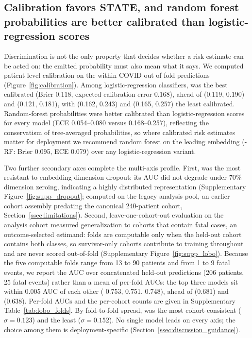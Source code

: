 \subsection{Calibration favors STATE, and random forest probabilities are better calibrated than logistic-regression scores}
\label{ssec:r5_calibration}

Discrimination is not the only property that decides whether a risk estimate
can be acted on: the emitted probability must also mean what it says. We
computed patient-level calibration on the within-COVID out-of-fold predictions
(Figure~\ref{fig:calibration}). Among logistic-regression classifiers,
 was the best calibrated (Brier 0.118, expected calibration error
0.168), ahead of  (0.119, 0.190) and 
(0.121, 0.181), with  (0.162, 0.243) and  (0.165,
0.257) the least calibrated. Random-forest probabilities were better
calibrated than logistic-regression scores for every model (ECE 0.054--0.080
versus 0.168--0.257), reflecting the conservatism of tree-averaged
probabilities, so where calibrated risk estimates matter for deployment we
recommend random forest on the leading embedding (-RF: Brier
0.095, ECE 0.079) over any logistic-regression variant.

Two further secondary axes complete the multi-axis profile. First,
 was the most resistant to embedding-dimension dropout: its AUC did
not degrade under 70\% dimension zeroing, indicating a highly distributed
representation (Supplementary Figure~\ref{fig:supp_dropout}; computed on the
legacy analysis pool, an earlier cohort assembly predating the canonical
240-patient cohort, Section~\ref{ssec:limitations}). Second,
leave-one-cohort-out evaluation on the analysis cohort measured
generalization to cohorts that contain fatal cases, an outcome-selected
estimand: folds are computable only when the held-out cohort contains both
classes, so survivor-only cohorts contribute to training throughout and are
never scored out-of-fold (Supplementary Figure~\ref{fig:supp_lobo}).
Because the five computable folds range from 13 to 90 patients and from 1 to
9 fatal events, we report the AUC over concatenated held-out predictions
(206 patients, 25 fatal events) rather than a mean of per-fold AUCs: the top
three models sit within 0.005 AUC of each other ( 0.753,
 0.751,  0.748), ahead of 
(0.681) and  (0.638). Per-fold AUCs and the per-cohort counts
are given in Supplementary Table~\ref{tab:lobo_folds}. By fold-to-fold spread,
 was the most cohort-consistent ($\sigma = 0.123$) and
 the least ($\sigma = 0.152$). No single model leads on every
axis; the choice among them is deployment-specific
(Section~\ref{ssec:discussion_guidance}).
